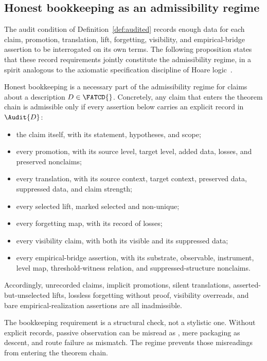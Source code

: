 \subsection{Honest bookkeeping as an admissibility regime}\label{subsec:honest-bookkeeping}

The audit condition of Definition~\ref{def:audited} records enough
data for each claim, promotion, translation, lift, forgetting,
visibility, and empirical-bridge assertion to be interrogated on its
own terms. The following proposition states that these record
requirements jointly constitute the admissibility regime, in a spirit
analogous to the axiomatic specification discipline of Hoare
logic~\citep{Hoare1969}.

\begin{proposition}\label{prop:honest-bookkeeping}
Honest bookkeeping is a necessary part of the admissibility regime for
claims about a description \(D \in \FATCD{}\). Concretely, any claim that
enters the theorem chain is admissible only if every assertion below
carries an explicit record in \(\Audit{D}\):
\begin{itemize}[topsep=2pt,itemsep=1pt]
  \item the claim itself, with its statement, hypotheses, and scope;
  \item every promotion, with its source level, target level, added data,
    losses, and preserved nonclaims;
  \item every translation, with its source context, target context,
    preserved data, suppressed data, and claim strength;
  \item every selected lift, marked selected and non-unique;
  \item every forgetting map, with its record of losses;
  \item every visibility claim, with both its visible and its suppressed
    data;
  \item every empirical-bridge assertion, with its substrate, observable,
    instrument, level map, threshold-witness relation, and
    suppressed-structure nonclaims.
\end{itemize}
Accordingly, unrecorded claims, implicit promotions, silent translations,
asserted-but-unselected lifts, lossless forgetting without proof,
visibility overreads, and bare empirical-realization assertions are all
inadmissible.
\end{proposition}

\begin{remark}\label{rem:why-honest-bookkeeping}
The bookkeeping requirement is a structural check, not a stylistic
one. Without explicit records, passive observation can be misread as
\Psix{}, mere packaging as \Pone{} descent, and route failure as
\Pthree{} mismatch. The regime prevents those misreadings from
entering the theorem chain.
\end{remark}


